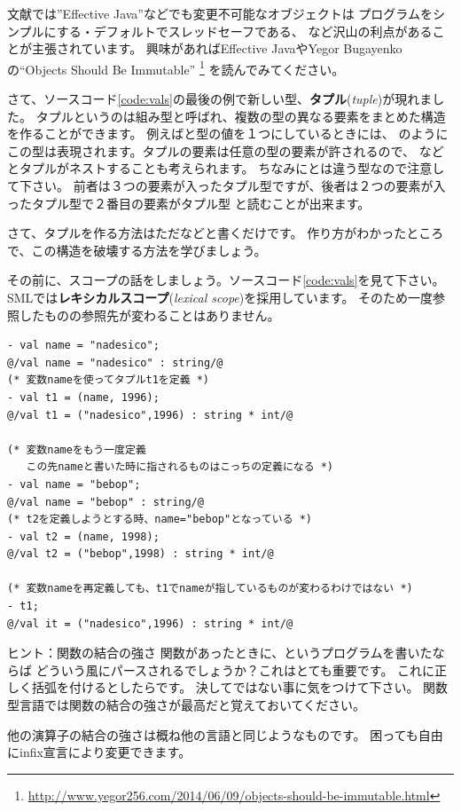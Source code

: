 \documentclass[11pt,a4paper]{jarticle}
\begin{document}
文献では''Effective Java''などでも変更不可能なオブジェクトは
プログラムをシンプルにする・デフォルトでスレッドセーフである、
など沢山の利点があることが主張されています。
興味があればEffective JavaやYegor Bugayenkoの``Objects Should Be Immutable''
\footnote{\url{http://www.yegor256.com/2014/06/09/objects-should-be-immutable.html}}
を読んでみてください。

さて、ソースコード\ref{code:vals}の最後の例で新しい型、{\bfseries タプル}({\itshape tuple})が現れました。
タプルというのは組み型と呼ばれ、複数の型の異なる要素をまとめた構造を作ることができます。
例えばと型の値を１つにしているときには、
のようにこの型は表現されます。タプルの要素は任意の型の要素が許されるので、
などとタプルがネストすることも考えられます。
ちなみにとは違う型なので注意して下さい。
前者は３つの要素が入ったタプル型ですが、後者は２つの要素が入ったタプル型で２番目の要素がタプル型
と読むことが出来ます。

さて、タプルを作る方法はただなどと書くだけです。
作り方がわかったところで、この構造を破壊する方法を学びましょう。

その前に、スコープの話をしましょう。ソースコード\ref{code:vals}を見て下さい。
SMLでは{\bfseries レキシカルスコープ}({\itshape lexical scope})を採用しています。
そのため一度参照したものの参照先が変わることはありません。

\begin{lstlisting}[caption=valのスコープ,label=code:vals]
- val name = "nadesico";
@/val name = "nadesico" : string/@
(* 変数nameを使ってタプルt1を定義 *)
- val t1 = (name, 1996);
@/val t1 = ("nadesico",1996) : string * int/@

(* 変数nameをもう一度定義
   この先nameと書いた時に指されるものはこっちの定義になる *)
- val name = "bebop";
@/val name = "bebop" : string/@
(* t2を定義しようとする時、name="bebop"となっている *)
- val t2 = (name, 1998);
@/val t2 = ("bebop",1998) : string * int/@

(* 変数nameを再定義しても、t1でnameが指しているものが変わるわけではない *)
- t1;
@/val it = ("nadesico",1996) : string * int/@
\end{lstlisting}

\begin{itembox}[l]{ヒント：関数の結合の強さ}
関数があったときに、というプログラムを書いたならば
どういう風にパースされるでしょうか？これはとても重要です。
これに正しく括弧を付けるとしたらです。
決してではない事に気をつけて下さい。
関数型言語では関数の結合の強さが最高だと覚えておいてください。

他の演算子の結合の強さは概ね他の言語と同じようなものです。
困っても自由にinfix宣言により変更できます。
\end{itembox}
\end{document}
